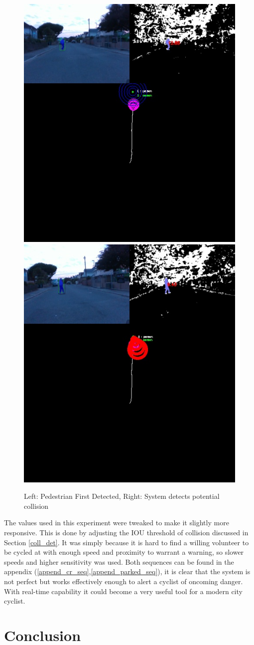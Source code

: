 \documentclass[11pt,twoside]{report}
\begin{document}
\noindent \begin{figure}[h!]
	\includegraphics[width = 0.5\hsize,trim={0 8cm 0 0},clip]{figures/crash_seq_1.jpg}
	\includegraphics[width = 0.5\hsize,trim={0 8cm 0 0},clip]{figures/crash_seq_2.jpg}
	\caption{Left: Pedestrian First Detected, Right: System detects potential collision}
	\label{staged_crash_seq}
\end{figure}

The values used in this experiment were tweaked to make it slightly more responsive. This is done by adjusting the IOU threshold of collision discussed in Section \ref{coll_det}. It was simply because it is hard to find a willing volunteer to be cycled at with enough speed and proximity to warrant a warning, so slower speeds and higher sensitivity was used. Both sequences can be found in the appendix (\ref{append_cr_seq},\ref{append_parked_seq}), it is clear that the system is not perfect but works effectively enough to alert a cyclist of oncoming danger. With real-time capability it could become a very useful tool for a modern city cyclist.


\chapter{Conclusion}
\end{document}
